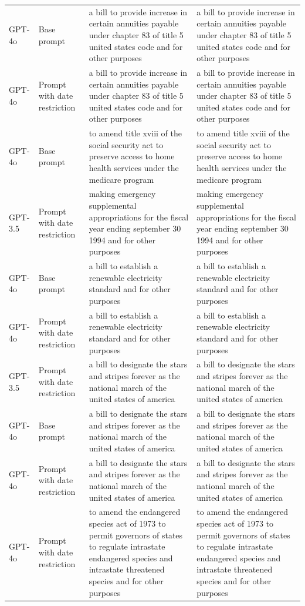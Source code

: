 \begin{longtable}{>{\raggedright\arraybackslash}p{1.4cm}>{\raggedright\arraybackslash}p{1.4cm}>{\raggedright\arraybackslash}p{5.5cm}>{\raggedright\arraybackslash}p{5.5cm}}
GPT-4o & Base prompt & a bill to provide increase in certain annuities payable under chapter 83 of title 5 united states code and for other purposes & a bill to provide increase in certain annuities payable under chapter 83 of title 5 united states code and for other purposes\\
GPT-4o & Prompt with date restriction & a bill to provide increase in certain annuities payable under chapter 83 of title 5 united states code and for other purposes & a bill to provide increase in certain annuities payable under chapter 83 of title 5 united states code and for other purposes\\
GPT-4o & Base prompt & to amend title xviii of the social security act to preserve access to home health services under the medicare program & to amend title xviii of the social security act to preserve access to home health services under the medicare program\\
GPT-3.5 & Prompt with date restriction & making emergency supplemental appropriations for the fiscal year ending september 30 1994 and for other purposes & making emergency supplemental appropriations for the fiscal year ending september 30 1994 and for other purposes\\
GPT-4o & Base prompt & a bill to establish a renewable electricity standard and for other purposes & a bill to establish a renewable electricity standard and for other purposes\\
GPT-4o & Prompt with date restriction & a bill to establish a renewable electricity standard and for other purposes & a bill to establish a renewable electricity standard and for other purposes\\
GPT-3.5 & Prompt with date restriction & a bill to designate the stars and stripes forever as the national march of the united states of america & a bill to designate the stars and stripes forever as the national march of the united states of america\\
GPT-4o & Base prompt & a bill to designate the stars and stripes forever as the national march of the united states of america & a bill to designate the stars and stripes forever as the national march of the united states of america\\
GPT-4o & Prompt with date restriction & a bill to designate the stars and stripes forever as the national march of the united states of america & a bill to designate the stars and stripes forever as the national march of the united states of america\\
GPT-4o & Prompt with date restriction & to amend the endangered species act of 1973 to permit governors of states to regulate intrastate endangered species and intrastate threatened species and for other purposes & to amend the endangered species act of 1973 to permit governors of states to regulate intrastate endangered species and intrastate threatened species and for other purposes\\

\end{longtable}
